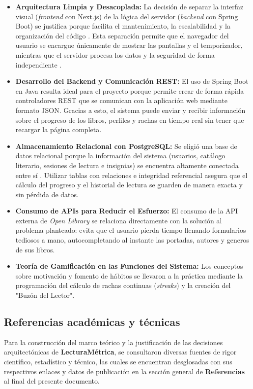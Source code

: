 \documentclass[12pt, atypical, journal]{article}
\begin{document}
\begin{itemize}
    \item \textbf{Arquitectura Limpia y Desacoplada:} La decisión de separar la interfaz visual (\textit{frontend} con Next.js) de la lógica del servidor (\textit{backend} con Spring Boot) se justifica porque facilita el mantenimiento, la escalabilidad y la organización del código \cite{martin2018, nextjs2025}. Esta separación permite que el navegador del usuario se encargue únicamente de mostrar las pantallas y el temporizador, mientras que el servidor procesa los datos y la seguridad de forma independiente \cite{spring2025}.
    
    \item \textbf{Desarrollo del Backend y Comunicación REST:} El uso de Spring Boot en Java resulta ideal para el proyecto porque permite crear de forma rápida controladores REST que se comunican con la aplicación web mediante formato JSON. Gracias a esto, el sistema puede enviar y recibir información sobre el progreso de los libros, perfiles y rachas en tiempo real sin tener que recargar la página completa.
    
    \item \textbf{Almacenamiento Relacional con PostgreSQL:} Se eligió una base de datos relacional porque la información del sistema (usuarios, catálogo literario, sesiones de lectura e insignias) se encuentra altamente conectada entre sí \cite{postgres2025}. Utilizar tablas con relaciones e integridad referencial asegura que el cálculo del progreso y el historial de lectura se guarden de manera exacta y sin pérdida de datos.
    
    \item \textbf{Consumo de APIs para Reducir el Esfuerzo:} El consumo de la API externa de \textit{Open Library} se relaciona directamente con la solución al problema planteado: evita que el usuario pierda tiempo llenando formularios tediosos a mano, autocompletando al instante las portadas, autores y generos de sus libros.
    
    \item \textbf{Teoría de Gamificación en las Funciones del Sistema:} Los conceptos sobre motivación y fomento de hábitos se llevaron a la práctica mediante la programación del cálculo de rachas continuas (\textit{streaks}) y la creación del "Buzón del Lector".
\end{itemize}

\subsection{Referencias académicas y técnicas}
Para la construcción del marco teórico y la justificación de las decisiones arquitectónicas de \textbf{LecturaMétrica}, se consultaron diversas fuentes de rigor científico, estadístico y técnico, las cuales se encuentran desglosadas con sus respectivos enlaces y datos de publicación en la sección general de \textbf{Referencias} al final del presente documento.
\end{document}
